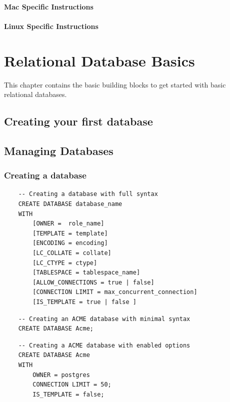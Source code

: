 \subsubsection*{Mac Specific Instructions}
\subsubsection*{Linux Specific Instructions}



\chapter{Relational Database Basics}
\label{chap:relational:relational-database-basics}
This chapter contains the basic building blocks to get started with basic relational databases.

\section{Creating your first database}

\section{Managing Databases}

\subsection{Creating a database}
\begin{verbatim}
    -- Creating a database with full syntax
    CREATE DATABASE database_name
    WITH
        [OWNER =  role_name]
        [TEMPLATE = template]
        [ENCODING = encoding]
        [LC_COLLATE = collate]
        [LC_CTYPE = ctype]
        [TABLESPACE = tablespace_name]
        [ALLOW_CONNECTIONS = true | false]
        [CONNECTION LIMIT = max_concurrent_connection]
        [IS_TEMPLATE = true | false ]
\end{verbatim}

\begin{verbatim}
    -- Creating an ACME database with minimal syntax
    CREATE DATABASE Acme;
\end{verbatim}

\begin{verbatim}
    -- Creating a ACME database with enabled options
    CREATE DATABASE Acme 
    WITH
        OWNER = postgres
        CONNECTION LIMIT = 50;
        IS_TEMPLATE = false;
\end{verbatim}

